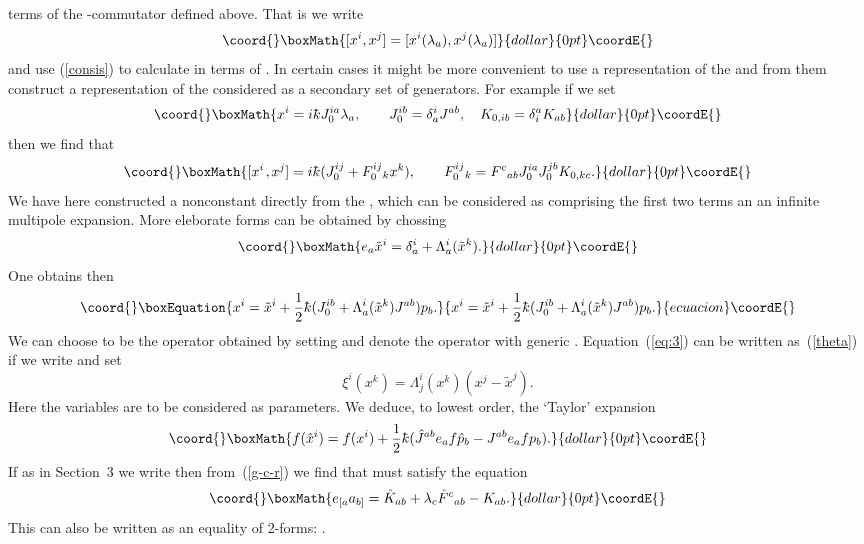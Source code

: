 \documentclass[a4paper,12pt]{article}
\def\h#1{\hat #1}
\def\t#1{\tilde #1}
\def\kbar{{\mathchar'26\mkern-9muk}}
\def\t#1{\tilde #1}
\def\k{\kern-.1em\mathbin{,}\kern-.1em}
\begin{document}
terms of the \coordHE{}-commuta\-tor defined above. That is we write
$$\coord{}\boxMath{
[x^i,x^j] = [x^i(\lambda_a), x^j(\lambda_a)]
}{dollar}{0pt}\coordE{}$$
and use (\ref{consis}) to calculate \coordHE{} in terms of
\coordHE{}. In certain cases it might be more
convenient to use a representation of the \coordHE{} and from them
construct a representation of the \coordHE{} considered as a secondary set
of generators. For example if we set
$$\coord{}\boxMath{
x^i = i \kbar J_0^{ia} \lambda_a, \qquad J_0^{ib} = \delta^i_a J^{ab},
\quad K_{0,ib} = \delta^a_i K_{ab}
}{dollar}{0pt}\coordE{}$$
then we find that
$$\coord{}\boxMath{
[x^i\k x^j] = i \kbar (J_0^{ij} + F_0^{ij}{}_k x^k), \qquad
F_0^{ij}{}_k = F^c{}_{ab} J_0^{ia} J_0^{jb} K_{0,kc}. 
}{dollar}{0pt}\coordE{}$$
We have here constructed a nonconstant 
\coordHE{} directly from the \coordHE{},
which can be considered as comprising the first two terms an an
infinite multipole expansion. More eleborate forms can be obtained by
chossing
$$\coord{}\boxMath{
e_a \t{x}^i = \delta^i_a + \Lambda^i_a(\t{x}^k).
}{dollar}{0pt}\coordE{}$$
One obtains then
\begin{equation}\coord{}\boxEquation{
x^i = \t{x}^i + \frac 12 \kbar (J_0^{ib} + 
\Lambda^i_a (\t{x}^k) J^{ab}) p_b.                             \label{eq:3}
}{
x^i = \t{x}^i + \frac 12 \kbar (J_0^{ib} + 
\Lambda^i_a (\t{x}^k) J^{ab}) p_b.                             }{ecuacion}\coordE{}\end{equation}
We can choose \coordHE{} to be the operator obtained by setting 
\myHighlight{$\Lambda^i_a (\t{x}^k) = 0$}\coordHE{} and denote \myHighlight{$\h{x}^i$}\coordHE{} the operator with
generic \myHighlight{$|\Lambda^i_a (\t{x}^k)| \ll \delta^i_a$}\coordHE{}.
Equation~(\ref{eq:3}) can be written as~(\ref{theta}) if we write
\coordHE{} and set
$$
\xi^i (x^k) = \Lambda^i_j(x^k) (x^j - \t{x}^j).               %
$$
Here the variables \myHighlight{$\t{x}^a$}\coordHE{} are to be considered as parameters. We
deduce, to lowest order, the `Taylor' expansion
$$\coord{}\boxMath{
f(\h{x}^i) = f(x^i) + 
\frac 12 \kbar (\h{J}^{ab} e_a f \h{p}_b  - J^{ab} e_a f p_b).
}{dollar}{0pt}\coordE{}$$
If as in Section~3 we write \myHighlight{$\h{\lambda}_b = \lambda_b + a_b$}\coordHE{} then
from~(\ref{g-c-r}) we find that \coordHE{} must satisfy the equation
$$\coord{}\boxMath{
e_{[a} a_{b]} = \h{K}_{ab} + \lambda_c \h{F}^c{}_{ab} - K_{ab}.
}{dollar}{0pt}\coordE{}$$
This can also be written as an equality of 2-forms:
\myHighlight{$da = d\theta + \theta^2 - \h{\theta}^2$}\coordHE{}.
\end{document}
